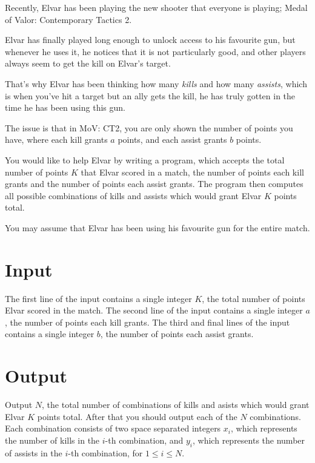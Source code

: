
Recently, Elvar has been playing the new shooter that everyone is playing; Medal of Valor: Contemporary Tactics 2.

Elvar has finally played long enough to unlock access to his favourite gun,
but whenever he uses it, he notices that it is not particularly good,
and other players always seem to get the kill on Elvar's target.

That's why Elvar has been thinking how many \emph{kills} and how many \emph{assists}, which is when
you've hit a target but an ally gets the kill, he has truly gotten in the time he has been using this gun.

The issue is that in MoV: CT2, you are only shown the number of points you have,
where each kill grants $a$ points, and each assist grants $b$ points.

You would like to help Elvar by writing a program,
which accepts the total number of points $K$ that Elvar scored in a match,
the number of points each kill grants and the number of points each
assist grants. The program then computes all possible combinations
of kills and assists which would grant Elvar $K$ points total.

You may assume that Elvar has been using his favourite gun for the entire match.

\section*{Input}
The first line of the input contains a single integer $K$, the total number of points Elvar scored in the match.
The second line of the input contains a single integer $a$, the number of points each kill grants.
The third and final lines of the input contains a single integer $b$, the number of points each assist grants.

\section*{Output}
Output $N$, the total number of combinations of kills and asists which would grant Elvar $K$ points total.
After that you should output each of the $N$ combinations.
Each combination consists of two space separated integers $x_i$, which represents the number of kills in the $i$-th combination,
and $y_i$, which represents the number of assists in the $i$-th combination, for $1 \leq i \leq N$.

